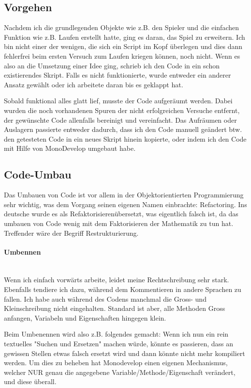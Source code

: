 \subsection{Vorgehen}
Nachdem ich die grundlegenden Objekte wie z.B. den Spieler und die einfachen Funktion wie z.B. Laufen erstellt hatte, ging es daran, das Spiel zu erweitern. Ich bin nicht einer der wenigen, die sich ein Script im Kopf überlegen und dies dann fehlerfrei beim ersten Versuch zum Laufen kriegen können, noch nicht. Wenn es also an die Umsetzung einer Idee ging, schrieb ich den Code in ein schon existierendes Skript.
Falls es nicht funktionierte, wurde entweder ein anderer Ansatz gewählt oder ich arbeitete daran bis es geklappt hat.

Sobald funktional alles glatt lief, musste der Code aufgeräumt werden. Dabei wurden die noch vorhandenen Spuren der nicht erfolgreichen Versuche entfernt, der gewünschte Code allenfalls bereinigt und vereinfacht. Das Aufräumen oder Auslagern passierte entweder dadurch, dass ich den Code manuell geändert btw. den getesteten Code in ein neues Skript hinein kopierte, oder indem ich den Code mit Hilfe von MonoDevelop umgebaut habe.

\subsection{Code-Umbau}
\label{subsubsec:refactoring}
Das Umbauen von Code ist vor allem in der Objektorientierten Programmierung sehr wichtig, was dem Vorgang seinen eigenen Namen einbrachte: Refactoring. Ins deutsche wurde es als \glqq Refaktorisieren\grqq übersetzt, was eigentlich falsch ist, da das umbauen von Code wenig mit  dem Faktorisieren der Mathematik zu tun hat.
Treffender wäre der Begriff \glqq Restrukturierung\grqq.


\paragraph{Umbennen}\mbox{} \\
Wenn ich einfach vorwärts arbeite, leidet meine Rechtschreibung sehr stark. Ebenfalls tendiere ich dazu, während dem Kommentieren in andere Sprachen zu fallen. Ich habe auch während des Codens manchmal die Gross- und Kleinschreibung nicht eingehalten. Standard ist aber, alle Methoden Gross anfangen, Variabeln und Eigenschaften hingegen klein.

Beim Umbenennen wird also z.B. folgendes gemacht:
Wenn ich nun ein rein textuelles "Suchen und Ersetzen" machen würde, könnte es passieren, dass an gewissen Stellen etwas falsch ersetzt wird und dann könnte nicht mehr kompiliert werden.
Um dies zu beheben hat Monodevelop einen eigenen Mechanismus, welcher NUR genau die angegebene Variable/Methode/Eigenschaft verändert, und diese überall.

